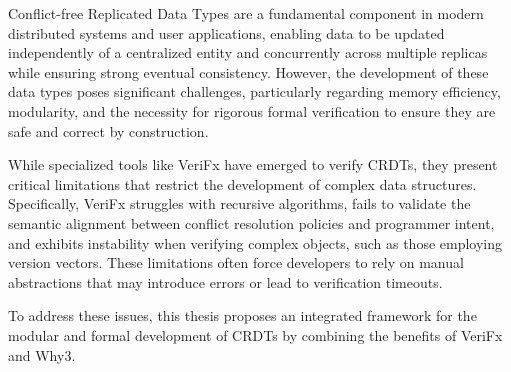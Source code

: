 
%

Conflict-free Replicated Data Types are a fundamental component in modern distributed systems and user applications, enabling data to be updated independently of a centralized entity and concurrently across multiple replicas while ensuring strong eventual consistency. However, the development of these data types poses significant challenges, particularly regarding memory efficiency, modularity, and the necessity for rigorous formal verification to ensure they are safe and correct by construction.

While specialized tools like VeriFx have emerged to verify CRDTs, they present critical limitations that restrict the development of complex data structures. Specifically, VeriFx struggles with recursive algorithms, fails to validate the semantic alignment between conflict resolution policies and programmer intent, and exhibits instability when verifying complex objects, such as those employing version vectors. These limitations often force developers to rely on manual abstractions that may introduce errors or lead to verification timeouts.

To address these issues, this thesis proposes an integrated framework for the modular and formal development of CRDTs by combining the benefits of VeriFx and Why3.


